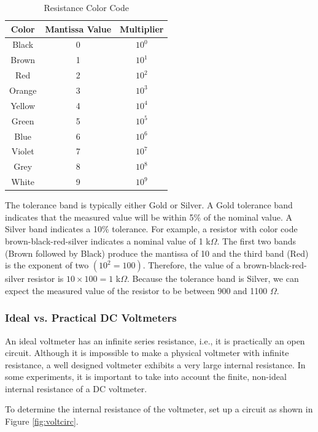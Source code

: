 \documentclass[12pt]{../manual}
\begin{document}
\def\arraystretch{1.4}
\begin{table}[ht!]
\caption{Resistance Color Code}
\centering
\begin{tabular}{|c|c|c|} \hline
Color 	& Mantissa Value & Multiplier \\ \hline \hline
Black 	& 0 & $10^0$ \\ \hline
Brown 	& 1 & $10^1$ \\ \hline
Red 	& 2 & $10^2$ \\ \hline
Orange 	& 3 & $10^3$ \\ \hline
Yellow	& 4 & $10^4$ \\ \hline
Green	& 5 & $10^5$ \\ \hline
Blue	& 6 & $10^6$ \\ \hline
Violet	& 7 & $10^7$ \\ \hline
Grey	& 8 & $10^8$ \\ \hline
White	& 9 & $10^9$ \\ \hline
\end{tabular}
\end{table}

The tolerance band is typically either Gold or Silver. A Gold tolerance band indicates that the measured value will be within 5\% of the nominal value. A Silver band indicates a 10\% tolerance. For example, a resistor with color code brown-black-red-silver indicates a nominal value of 1 k$\Omega$. The first two bands (Brown followed by Black) produce the mantissa of 10 and the third band (Red) is the exponent of two $(10^2 = 100)$. Therefore, the value of a brown-black-red-silver resistor is $10 \times 100 = 1$ k$\Omega$. Because the tolerance band is Silver, we can expect the measured value of the resistor to be between 900 and 1100 $\Omega$. 

\subsubsection{Ideal vs. Practical DC Voltmeters}
An ideal voltmeter has an infinite series resistance, i.e., it is practically an open circuit. Although it is impossible to make a physical voltmeter with infinite resistance, a well designed voltmeter exhibits a very large internal resistance. In some experiments, it is important to take into account the finite, non-ideal internal resistance of a DC voltmeter.

To determine the internal resistance of the voltmeter, set up a circuit as shown in Figure \ref{fig:voltcirc}.
\end{document}
